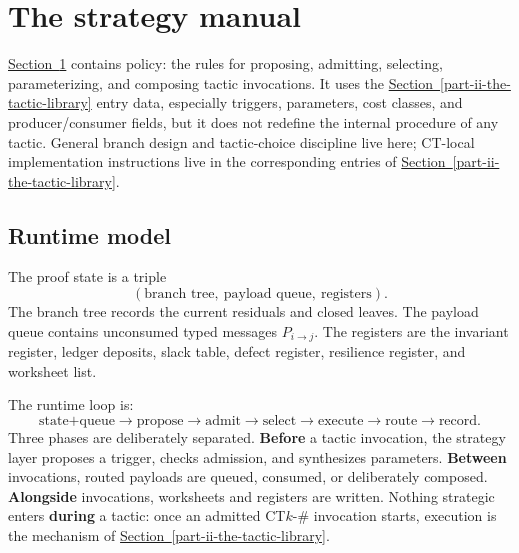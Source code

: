 \documentclass[
  11pt,
]{article}
\theoremstyle{definition}
\newcommand{\secref}[1]{\hyperref[#1]{Section~\ref*{#1}}}
\begin{document}
\section{The strategy manual}\label{part-iii-the-strategy-manual}

\secref{part-iii-the-strategy-manual} contains policy: the rules for proposing, admitting,
selecting, parameterizing, and composing tactic invocations. It uses the
\secref{part-ii-the-tactic-library} entry data, especially triggers, parameters, cost classes, and
producer/consumer fields, but it does not redefine the internal
procedure of any tactic. General branch design and tactic-choice
discipline live here; CT-local implementation instructions live in the
corresponding entries of \secref{part-ii-the-tactic-library}.

\subsection{Runtime model}\label{runtime-model}

The proof state is a triple
\[
(\text{branch tree},\ \text{payload queue},\ \text{registers}).
\]
The branch tree records the current residuals and closed leaves. The
payload queue contains unconsumed typed messages \(P_{i\to j}\). The
registers are the invariant register, ledger deposits, slack table,
defect register, resilience register, and worksheet list.

The runtime loop is:
\[
\text{state+queue}\to\text{propose}\to\text{admit}\to\text{select}
\to\text{execute}\to\text{route}\to\text{record}.
\]
Three phases are deliberately separated. \textbf{Before} a tactic
invocation, the strategy layer proposes a trigger, checks admission, and
synthesizes parameters. \textbf{Between} invocations, routed payloads are
queued, consumed, or deliberately composed. \textbf{Alongside}
invocations, worksheets and registers are written. Nothing strategic
enters \textbf{during} a tactic: once an admitted CT\(k\)-\(\#\)
invocation starts, execution is the mechanism of \secref{part-ii-the-tactic-library}.
\end{document}
